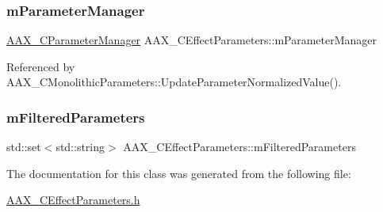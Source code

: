 \subsubsection{\texorpdfstring{mParameterManager}{mParameterManager}}
{\footnotesize\ttfamily \mbox{\hyperlink{a01545}{A\+A\+X\+\_\+\+C\+Parameter\+Manager}} A\+A\+X\+\_\+\+C\+Effect\+Parameters\+::m\+Parameter\+Manager\hspace{0.3cm}{\ttfamily [protected]}}



Referenced by A\+A\+X\+\_\+\+C\+Monolithic\+Parameters\+::\+Update\+Parameter\+Normalized\+Value().

\mbox{\label{a01481_a353f5472e4eaefd348f20f9ff07a13a0}} 
\subsubsection{\texorpdfstring{mFilteredParameters}{mFilteredParameters}}
{\footnotesize\ttfamily std\+::set$<$std\+::string$>$ A\+A\+X\+\_\+\+C\+Effect\+Parameters\+::m\+Filtered\+Parameters\hspace{0.3cm}{\ttfamily [protected]}}



The documentation for this class was generated from the following file\+:\begin{DoxyCompactItemize}
\item 
\mbox{\hyperlink{a00428}{A\+A\+X\+\_\+\+C\+Effect\+Parameters.\+h}}\end{DoxyCompactItemize}
